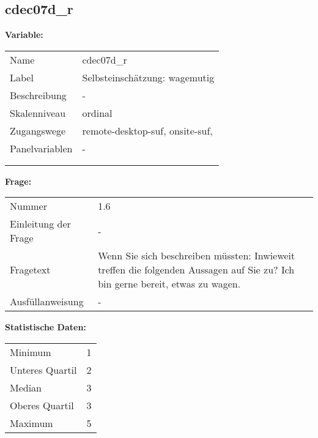 	
	
	\subsection{cdec07d\_r}
	\label{subSection:cdec07d_r}

	\noindent\textbf{Variable:}\\
		\begin{tabular}{lL{11.3cm}}
			\label{tableVariable:cdec07d_r}
			Name & cdec07d\_r \\
			Label & Selbsteinschätzung: wagemutig \\
			Beschreibung & - \\
			Skalenniveau & ordinal \\
			Zugangswege &
				remote-desktop-suf,
				onsite-suf,
 \\
			Panelvariablen & -
			 \\
			 \\
 \\
		\end{tabular}

		\vspace*{1 cm}
		\noindent\textbf{Frage:}\\
		\begin{tabular}{lL{11.3cm}}
			\label{tableQuestion:cdec07d_r}
			Nummer & 1.6 \\
			Einleitung der Frage & - \\
			Fragetext & Wenn Sie sich beschreiben müssten: Inwieweit treffen die folgenden Aussagen auf Sie zu?
Ich bin gerne bereit, etwas zu wagen. \\
			Ausfüllanweisung & - \\
		\end{tabular}


		\vspace*{1 cm}
		\noindent\textbf{Statistische Daten:}\\
			\begin{tabular}{ll}
				\label{tableStatistics:cdec07d_r}
					Minimum & 1 \\
					Unteres Quartil & 2 \\
					Median & 3 \\
					Oberes Quartil & 3 \\
					Maximum & 5 \\
			\end{tabular}



